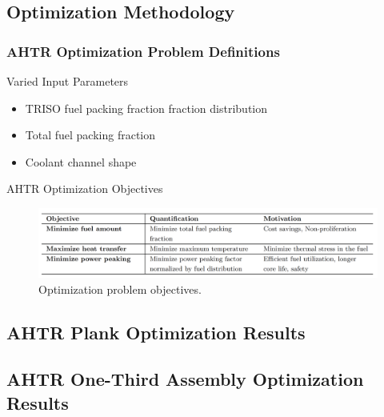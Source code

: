 \subsection{Optimization Methodology}
\begin{frame}
    \frametitle{AHTR Optimization Problem Definitions}
    \begin{block}{Varied Input Parameters}
        \begin{itemize}
            \item TRISO fuel packing fraction fraction distribution 
            \item Total fuel packing fraction 
            \item Coolant channel shape 
        \end{itemize}
    \end{block}
    \begin{block}{AHTR Optimization Objectives}
        \begin{figure}
            \includegraphics[width=0.9\linewidth]{figures/ahtr-opt-obj.png} 
            \caption{Optimization problem objectives.}
        \end{figure}
    \end{block}
\end{frame}

\subsection{AHTR Plank Optimization Results}

\subsection{AHTR One-Third Assembly Optimization Results}